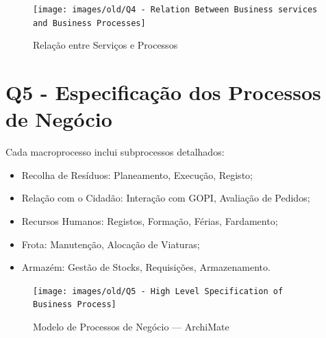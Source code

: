 \documentclass[12pt,a4paper,final]{article}
\begin{document}
    \begin{figure}[H]
        \centering
        \texttt{[image: images/old/Q4 - Relation Between Business services and Business Processes]}
        \caption{Relação entre Serviços e Processos}
        \label{fig:4}
    \end{figure}

    \section*{Q5 - Especificação dos Processos de Negócio}\label{sec:especificacao-dos-processos-de-negocio}
    Cada macroprocesso inclui subprocessos detalhados:
    \begin{itemize}
        \item Recolha de Resíduos: Planeamento, Execução, Registo;
        \item Relação com o Cidadão: Interação com GOPI, Avaliação de Pedidos;
        \item Recursos Humanos: Registos, Formação, Férias, Fardamento;
        \item Frota: Manutenção, Alocação de Viaturas;
        \item Armazém: Gestão de Stocks, Requisições, Armazenamento.
    \end{itemize}

    \begin{figure}[H]
        \centering
        \texttt{[image: images/old/Q5 - High Level Specification of Business Process]}
        \caption{Modelo de Processos de Negócio — ArchiMate}
        \label{fig:5}
    \end{figure}

    \newpage
    \nocite{*}
    \printbibliography
\end{document}
